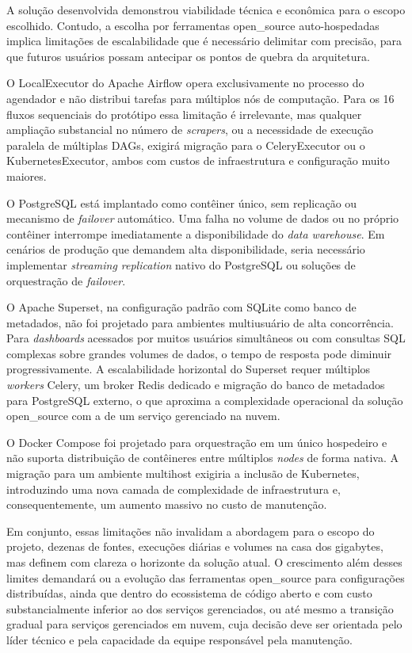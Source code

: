 A solução desenvolvida demonstrou viabilidade técnica e econômica para o escopo
escolhido. Contudo, a escolha por ferramentas \acs{open_source}
auto-hospedadas implica limitações de escalabilidade que é necessário delimitar
com precisão, para que futuros usuários possam antecipar os pontos de quebra
da arquitetura.

O LocalExecutor do Apache Airflow opera exclusivamente no processo do agendador
e não distribui tarefas para múltiplos nós de computação. Para os 16 fluxos
sequenciais do protótipo essa limitação é irrelevante, mas qualquer ampliação
substancial no número de \textit{scrapers}, ou a necessidade de execução
paralela de múltiplas DAGs, exigirá migração para o CeleryExecutor ou o
KubernetesExecutor, ambos com custos de infraestrutura e configuração
muito maiores.

O PostgreSQL está implantado como contêiner único, sem replicação ou mecanismo
de \textit{failover} automático. Uma falha no volume de dados ou no próprio contêiner
interrompe imediatamente a disponibilidade do \textit{data warehouse}. Em cenários
de produção que demandem alta disponibilidade, seria necessário implementar
\textit{streaming replication} nativo do PostgreSQL ou soluções de orquestração de
\textit{failover}.

O Apache Superset, na configuração padrão com SQLite como banco de metadados,
não foi projetado para ambientes multiusuário de alta concorrência. Para
\textit{dashboards} acessados por muitos usuários simultâneos ou com consultas
SQL complexas sobre grandes volumes de dados, o tempo de resposta pode diminuir
progressivamente. A escalabilidade horizontal do Superset requer múltiplos
\textit{workers} Celery, um broker Redis dedicado e migração do banco de metadados
para PostgreSQL externo, o que aproxima a complexidade operacional da solução
\acs{open_source} com a de um serviço gerenciado na nuvem.

O Docker Compose foi projetado para orquestração em um único hospedeiro e não
suporta distribuição de contêineres entre múltiplos \textit{nodes} de forma nativa. A migração
para um ambiente multihost exigiria a inclusão de Kubernetes,
introduzindo uma nova camada de complexidade de infraestrutura e, consequentemente,
um aumento massivo no custo de manutenção.

Em conjunto, essas limitações não invalidam a abordagem para o escopo do projeto, 
dezenas de fontes, execuções diárias e volumes na casa dos gigabytes, mas
definem com clareza o horizonte da solução atual. O crescimento além
desses limites demandará ou a evolução das ferramentas \acs{open_source} para
configurações distribuídas, ainda que dentro do ecossistema de código aberto e com
custo substancialmente inferior ao dos serviços gerenciados, ou até mesmo a transição gradual para serviços gerenciados em
nuvem, cuja decisão deve ser orientada pelo líder técnico e pela capacidade da equipe
responsável pela manutenção.

